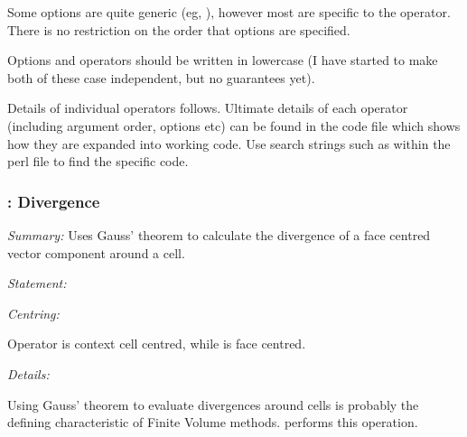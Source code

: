 
Some options are quite generic (eg, ), however most are specific to the operator.  There is no restriction on the order that options are specified.

Options and operators should be written in lowercase (I have started to make both of these case independent, but no guarantees yet).

Details of individual operators follows.  Ultimate details of each operator (including argument order, options etc) can be found in the code file  which shows how they are expanded into working code.  Use search strings such as  within the perl file to find the specific code.

\subsubsection{: Divergence}


\emph{Summary:} Uses Gauss' theorem to calculate the divergence of a face centred vector component around a cell.

\emph{Statement:}


\emph{Centring:}

Operator is context cell centred, while  is face centred.

\emph{Details:}

Using Gauss' theorem to evaluate divergences around cells is probably the defining characteristic of Finite Volume methods.   performs this operation.

